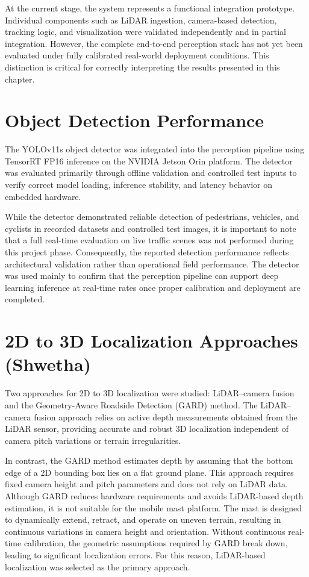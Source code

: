 \documentclass[12pt,a4paper]{report}
\begin{document}
{At the current stage, the system represents a functional integration prototype. Individual components such as LiDAR ingestion, camera-based detection, tracking logic, and visualization were validated independently and in partial integration. However, the complete end-to-end perception stack has not yet been evaluated under fully calibrated real-world deployment conditions. This distinction is critical for correctly interpreting the results presented in this chapter.

\section{Object Detection Performance}
The YOLOv11s object detector was integrated into the perception pipeline using TensorRT FP16 inference on the NVIDIA Jetson Orin platform. The detector was evaluated primarily through offline validation and controlled test inputs to verify correct model loading, inference stability, and latency behavior on embedded hardware.

While the detector demonstrated reliable detection of pedestrians, vehicles, and cyclists in recorded datasets and controlled test images, it is important to note that a full real-time evaluation on live traffic scenes was not performed during this project phase. Consequently, the reported detection performance reflects architectural validation rather than operational field performance. The detector was used mainly to confirm that the perception pipeline can support deep learning inference at real-time rates once proper calibration and deployment are completed.

\section{2D to 3D Localization Approaches (Shwetha)}
Two approaches for 2D to 3D localization were studied: LiDAR–camera fusion and the Geometry-Aware Roadside Detection (GARD) method. The LiDAR–camera fusion approach relies on active depth measurements obtained from the LiDAR sensor, providing accurate and robust 3D localization independent of camera pitch variations or terrain irregularities.

In contrast, the GARD method estimates depth by assuming that the bottom edge of a 2D bounding box lies on a flat ground plane. This approach requires fixed camera height and pitch parameters and does not rely on LiDAR data. Although GARD reduces hardware requirements and avoids LiDAR-based depth estimation, it is not suitable for the mobile mast platform. The mast is designed to dynamically extend, retract, and operate on uneven terrain, resulting in continuous variations in camera height and orientation. Without continuous real-time calibration, the geometric assumptions required by GARD break down, leading to significant localization errors. For this reason, LiDAR-based localization was selected as the primary approach.

}
\end{document}
